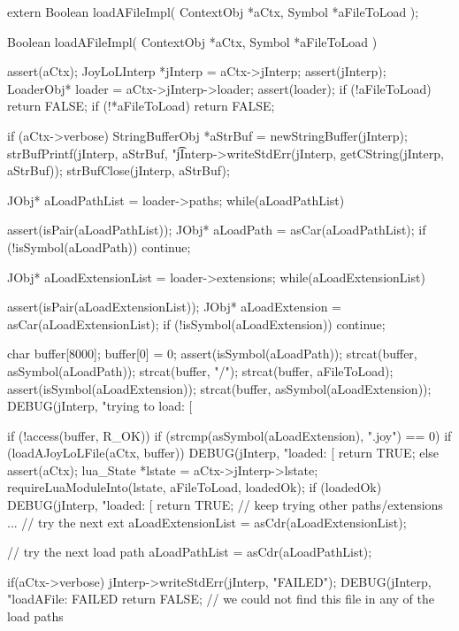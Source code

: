 \startCHeader
extern Boolean loadAFileImpl(
  ContextObj *aCtx,
  Symbol     *aFileToLoad
);
\stopCHeader
{}

\startCCode
Boolean loadAFileImpl(
  ContextObj *aCtx,
  Symbol     *aFileToLoad
) {
  assert(aCtx);
  JoyLoLInterp *jInterp = aCtx->jInterp;
  assert(jInterp);
  LoaderObj* loader = aCtx->jInterp->loader;
  assert(loader);
  if (!aFileToLoad) return FALSE;
  if (!*aFileToLoad) return FALSE;

  if (aCtx->verbose) {
    StringBufferObj *aStrBuf = 
      newStringBuffer(jInterp);
    strBufPrintf(jInterp, aStrBuf, "\t%
    jInterp->writeStdErr(jInterp, getCString(jInterp, aStrBuf));
    strBufClose(jInterp, aStrBuf);
  }

  JObj* aLoadPathList = loader->paths;
  while(aLoadPathList) {
    assert(isPair(aLoadPathList));
    JObj* aLoadPath = asCar(aLoadPathList);
    if (!isSymbol(aLoadPath)) continue;

    JObj* aLoadExtensionList = loader->extensions;
    while(aLoadExtensionList) {
      assert(isPair(aLoadExtensionList));
      JObj* aLoadExtension = asCar(aLoadExtensionList);
      if (!isSymbol(aLoadExtension)) continue;

      char buffer[8000];
      buffer[0] = 0;
      assert(isSymbol(aLoadPath));
      strcat(buffer, asSymbol(aLoadPath));
      strcat(buffer, "/");
      strcat(buffer, aFileToLoad);
      assert(isSymbol(aLoadExtension));
      strcat(buffer, asSymbol(aLoadExtension));
      DEBUG(jInterp, "trying to load: [%

      if (!access(buffer, R_OK)) {
        if (strcmp(asSymbol(aLoadExtension), ".joy") == 0) {
          if (loadAJoyLoLFile(aCtx, buffer)) {
            DEBUG(jInterp, "loaded: [%
            return TRUE;
          }
        } else {
          assert(aCtx);
          lua_State *lstate = aCtx->jInterp->lstate;
          requireLuaModuleInto(lstate, aFileToLoad, loadedOk);
          if (loadedOk) {
            DEBUG(jInterp, "loaded: [%
            return TRUE;
          }
        }
        // keep trying other paths/extensions ...
      }
      // try the next ext
      aLoadExtensionList = asCdr(aLoadExtensionList);
    }
    // try the next load path
    aLoadPathList = asCdr(aLoadPathList);
  }
  if(aCtx->verbose) {
    jInterp->writeStdErr(jInterp, "FAILED\n");
  }
  DEBUG(jInterp, "loadAFile: FAILED%
  return FALSE; // we could not find this file in any of the load paths
}
\stopCCode


